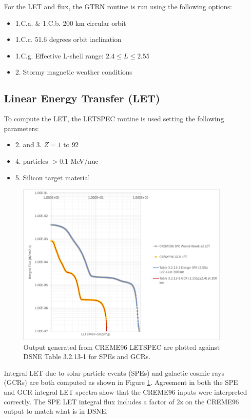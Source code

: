 \documentclass{hitec}
\begin{document}
For the LET and flux, the \textsf{GTRN} routine is run using the following options:
\begin{itemize}
	\item 1.C.a. \& 1.C.b. 200 km circular orbit
	\item 1.C.c. 51.6 degrees orbit inclination
	\item 1.C.g. Effective L-shell range: $2.4 \le L \le 2.55$
	\item 2. Stormy magnetic weather conditions
\end{itemize}

\subsection{Linear Energy Transfer (LET)}\label{ssec:LET}

To compute the LET, the \textsf{LETSPEC} routine is used setting the following parameters:
\begin{itemize}
	\item 2. and 3. $Z = 1 \text{ to } 92$
	\item 4. particles $> 0.1 $ MeV/nuc
	\item 5. Silicon target material
\end{itemize}
\begin{figure}[htbp!]
	\centering
	\includegraphics[width=0.95\textwidth]{DSNE_LET_Comparison.png}
	\caption{Output generated from CREME96 \textsf{LETSPEC} are plotted against DSNE Table 3.2.13-1 for SPEs and GCRs.}\label{fig:DSNE_LET_Comparison}
\end{figure}

Integral LET due to solar particle events (SPEs) and galactic cosmic rays (GCRs) are both computed as shown in Figure \ref{fig:DSNE_LET_Comparison}. Agreement in both the SPE and GCR integral LET spectra show that the CREME96 inputs were interpreted correctly. The SPE LET integral flux includes a factor of $2\textsf{x}$ on the CREME96 output to match what is in DSNE.
\end{document}
